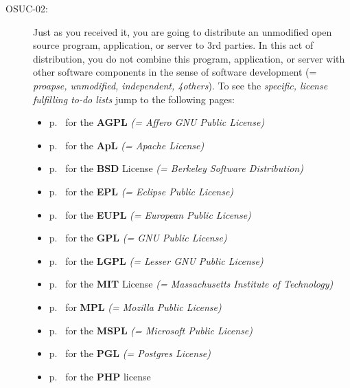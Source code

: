 \begin{description}
\item[OSUC-02:]\label{OSUC-02-DEF} Just as you received it, you are going to
distribute an unmodified open source program, application, or server to 3rd
parties. In this act of distribution, you do not combine this program,
application, or server with other software components in the sense of software
development (= \textit{proapse, unmodified, independent, 4others}). 
To see the \textit{specific, license fulfilling to-do lists} jump to the
following pages:
   \begin{itemize}
    \item p.\ \pageref{OSUC-02-AGPL} for the \textbf{AGPL}
      \textit{(= Affero GNU Public License)} 
    \item p.\ \pageref{OSUC-02-Apache20} for the \textbf{ApL}
      \textit{(= Apache License)}
    \item p.\ \pageref{OSUC-02-BSD} for the \textbf{BSD} License
      \textit{(= Berkeley Software Distribution)}
    \item p.\ \pageref{OSUC-02-EPL} for the \textbf{EPL}
      \textit{(= Eclipse Public License)}     
    \item p.\ \pageref{OSUC-02-EUPL} for the \textbf{EUPL}
      \textit{(= European Public License)} 
    \item p.\ \pageref{OSUC-02-GPL} for the \textbf{GPL}
       \textit{(= GNU Public License)} 
    \item p.\ \pageref{OSUC-02-LGPL} for the \textbf{LGPL}
      \textit{(= Lesser GNU Public License)}           
    \item p.\ \pageref{OSUC-02-MIT} for the \textbf{MIT} License
       \textit{(= Massachusetts Institute of Technology)} 
    \item p.\ \pageref{OSUC-02-MPL} for \textbf{MPL}
      \textit{(= Mozilla Public License)}     
    \item p.\ \pageref{OSUC-02-MsPL} for the \textbf{MSPL}
      \textit{(= Microsoft Public License)} 
    \item p.\ \pageref{OSUC-02-PGL} for the \textbf{PGL}
      \textit{(= Postgres License)} 
    \item p.\ \pageref{OSUC-02-PHP} for the \textbf{PHP} license 
  \end{itemize}


\end{description}
